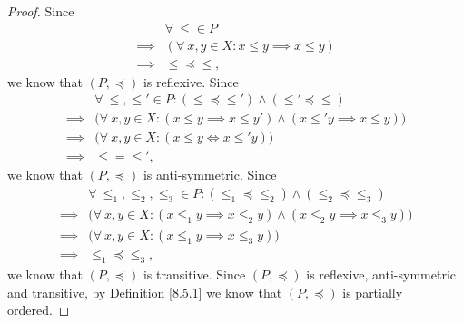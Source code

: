\begin{proof}
    Since
    \begin{align*}
                 & \forall\ \leq \in P                                \\
        \implies & (\forall\ x, y \in X : x \leq y \implies x \leq y) \\
        \implies & \leq \preceq \leq,
    \end{align*}
    we know that \((P, \preceq)\) is reflexive.
    Since
    \begin{align*}
                 & \forall\ \leq, \leq' \in P : (\leq \preceq \leq') \land (\leq' \preceq \leq)                      \\
        \implies & \big(\forall\ x, y \in X : (x \leq y \implies x \leq y') \land (x \leq' y \implies x \leq y)\big) \\
        \implies & \big(\forall\ x, y \in X : (x \leq y \iff x \leq' y)\big)                                         \\
        \implies & \leq = \leq',
    \end{align*}
    we know that \((P, \preceq)\) is anti-symmetric.
    Since
    \begin{align*}
                 & \forall\ \leq_1, \leq_2, \leq_3 \in P : (\leq_1 \preceq \leq_2) \land (\leq_2 \preceq \leq_3)           \\
        \implies & \big(\forall\ x, y \in X : (x \leq_1 y \implies x \leq_2 y) \land (x \leq_2 y \implies x \leq_3 y)\big) \\
        \implies & \big(\forall\ x, y \in X : (x \leq_1 y \implies x \leq_3 y)\big)                                        \\
        \implies & \leq_1 \preceq \leq_3,
    \end{align*}
    we know that \((P, \preceq)\) is transitive.
    Since \((P, \preceq)\) is reflexive, anti-symmetric and transitive, by Definition \ref{8.5.1} we know that \((P, \preceq)\) is partially ordered.


\end{proof}
